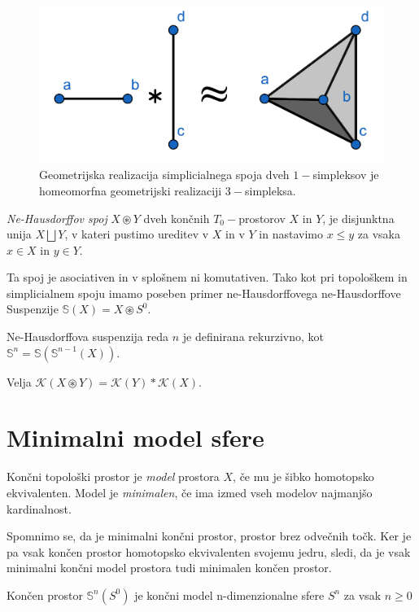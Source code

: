 \documentclass[mat1]{fmfdelo}
\newcommand{\Sus}{\mathbb S}
\begin{document}
\begin{figure}[h]
    \centering
    \includegraphics[width=0.6\linewidth]{spoj.png}
    \caption{Geometrijska realizacija simplicialnega spoja dveh $1-$simpleksov je homeomorfna geometrijski realizaciji $3-$simpleksa.}
\end{figure}

\begin{definicija}
    \textit{Ne-Hausdorffov spoj} $X\circledast Y$ dveh končnih $T_0-$prostorov
     $X$ in $Y$, je disjunktna unija $X\bigsqcup Y$, v kateri
     pustimo ureditev v $X$ in v $Y$ in nastavimo $x\leq y$ za vsaka 
     $x\in X$ in $y\in Y$.
\end{definicija}

Ta spoj je asociativen in v splošnem ni komutativen. Tako kot pri topološkem
 in simplicialnem spoju imamo poseben primer ne-Hausdorffovega ne-Hausdorffove Suspenzije
  $\Sus(X)=X \circledast S^0$.

  Ne-Hausdorffova suspenzija reda $n$ je definirana rekurzivno, kot  $\Sus^n=\Sus(\Sus^{n-1}(X))$.
  \begin{opomba}
    Velja $\mathcal{K}(X\circledast Y) = \mathcal{K}(Y)\ast \mathcal{K}(X)$.
    \label{op:spoj}
  \end{opomba}

  \section{Minimalni model sfere}


  \begin{definicija}
      Končni topološki prostor je \textit{model} prostora $X$, če mu je šibko homotopsko ekvivalenten. Model je \textit{minimalen}, če ima izmed vseh modelov najmanjšo kardinalnost.
  \end{definicija}
  
  Spomnimo se, da je minimalni končni prostor, prostor brez odvečnih točk. Ker je pa vsak končen prostor homotopsko ekvivalenten svojemu jedru, sledi, da je vsak minimalni končni model prostora tudi minimalen končen prostor.
  
  \begin{trditev}
      Končen prostor $\Sus^n(S^0)$ je končni model n-dimenzionalne sfere $S^n$ za vsak $n\geq 0$
  \end{trditev}
  
\end{document}
